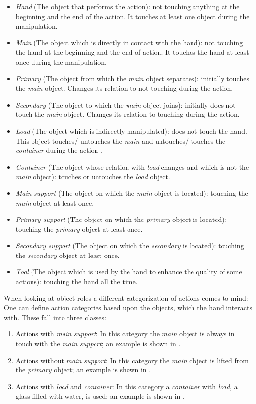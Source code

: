 \begin{itemize}
  \item \emph{Hand} (The object that performs the action): not touching anything at the beginning and the end of the action. It touch\-es at least one object during the manipulation.
  \item \emph{Main} (The object which is directly in contact with the hand): not touching the hand at the beginning and the end of action. It touches the hand at least once during the manipulation.
  \item \emph{Primary} (The object from which the \emph{main} object separates): initially touches the \emph{main} object. Changes its relation to not-touching during the action.
  \item \emph{Secondary} (The object to which the \emph{main} object joins): initially does not touch the \emph{main} object. Changes its relation to touching during the action.
  \item \emph{Load} (The object which is indirectly manipulated): does not touch the hand. This object touches/ untouches the \emph{main} and untouches/ touches the \emph{container} during the action .
  \item \emph{Container} (The object whose relation with \emph{load} changes and which is not the \emph{main} object): touches or untouches the \emph{load} object.
  \item \emph{Main support} (The object on which the \emph{main} object is located): touching the \emph{main} object at least once.
  \item \emph{Primary support} (The object on which the \emph{primary} object is located): touching the \emph{primary} object at least once.
  \item \emph{Secondary support} (The object on which the \emph{secondary} is located): touching the \emph{secondary} object at least once.
  \item \emph{Tool} (The object which is used by the hand to enhance the quality of some actions): touching the hand all the time.
\end{itemize}

When looking at object roles a different categorization of actions comes to mind: One can define action categories based upon the objects, which the hand interacts with.
These fall into three classes:

\begin{enumerate}
  \item Actions with \emph{main support}: In this category the \emph{main} object is always in touch with the \emph{main support}; an example is shown in .
  \item Actions without \emph{main support}: In this category the \emph{main} object is lifted from the \emph{primary} object; an example is shown in .
  \item Actions with \emph{load} and \emph{container}: In this category a \emph{container} with \emph{load}, \eg a glass filled with water, is used; an example is shown in .
\end{enumerate}

